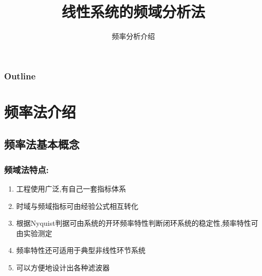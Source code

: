 \documentclass[table]{article}
\subtitle{频率分析介绍}
\title{线性系统的频域分析法}
\author{}
\date{}
\begin{document}
\maketitle

\begin{frame}
\frametitle{Outline}
\setcounter{tocdepth}{3}
\tableofcontents
\end{frame}










\section{频率法介绍}
\label{sec-1}
\subsection{频率法基本概念}
\label{sec-1-1}
\begin{frame}
\frametitle{频域法特点:}
\label{sec-1-1-1}

\begin{enumerate}
\item <2->工程使用广泛,有自己一套指标体系
\item <3->时域与频域指标可由经验公式相互转化
\item <4->根据Nyquist判据可由系统的开环频率特性判断闭环系统的稳定性,频率特性可由实验测定
\item <5->频率特性还可适用于典型非线性环节系统
\item <6->可以方便地设计出各种滤波器
\end{enumerate}
\end{frame}
\end{document}

